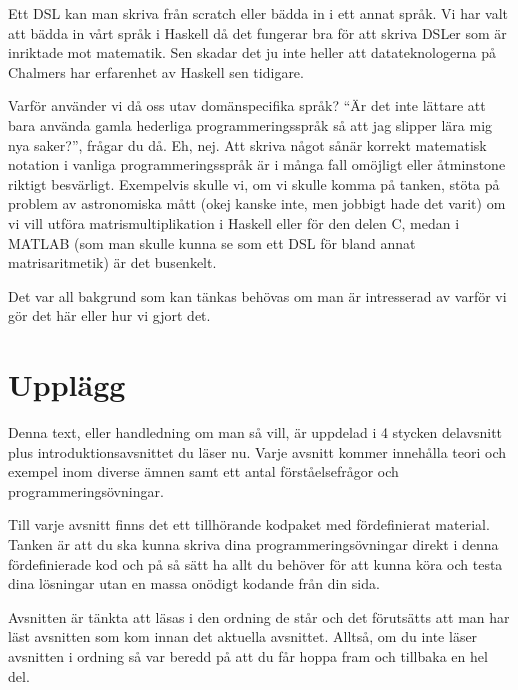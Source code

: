 \documentclass{article}
\begin{document}
Ett DSL kan man skriva från scratch eller bädda in i ett annat språk. Vi har valt att bädda in vårt språk i Haskell då det fungerar bra för att skriva DSLer som är inriktade mot matematik. Sen skadar det ju inte heller att datateknologerna på Chalmers har erfarenhet av Haskell sen tidigare.

Varför använder vi då oss utav domänspecifika språk? “Är det inte lättare att bara använda gamla hederliga programmeringsspråk så att jag slipper lära mig nya saker?”, frågar du då. Eh, nej. Att skriva något sånär korrekt matematisk notation i vanliga programmeringsspråk är i många fall omöjligt eller åtminstone riktigt besvärligt.
Exempelvis skulle vi, om vi skulle komma på tanken, stöta på problem av astronomiska mått (okej kanske inte, men jobbigt hade det varit) om vi vill utföra matrismultiplikation i Haskell eller för den delen C, medan i MATLAB (som man skulle kunna se som ett DSL för bland annat matrisaritmetik) är det busenkelt.

Det var all bakgrund som kan tänkas behövas om man är intresserad av varför vi gör det här eller hur vi gjort det.



\section{Upplägg}
Denna text, eller handledning om man så vill, är uppdelad i 4 stycken delavsnitt plus introduktionsavsnittet du läser nu. Varje avsnitt kommer innehålla teori och exempel inom diverse ämnen samt ett antal förståelsefrågor och programmeringsövningar.

Till varje avsnitt finns det ett tillhörande kodpaket med fördefinierat material. Tanken är att du ska kunna skriva dina programmeringsövningar direkt i denna fördefinierade kod och på så sätt ha allt du behöver för att kunna köra och testa dina lösningar utan en massa onödigt kodande från din sida.

Avsnitten är tänkta att läsas i den ordning de står och det förutsätts att man har läst avsnitten som kom innan det aktuella avsnittet. Alltså, om du inte läser avsnitten i ordning så var beredd på att du får hoppa fram och tillbaka en hel del.
\end{document}
